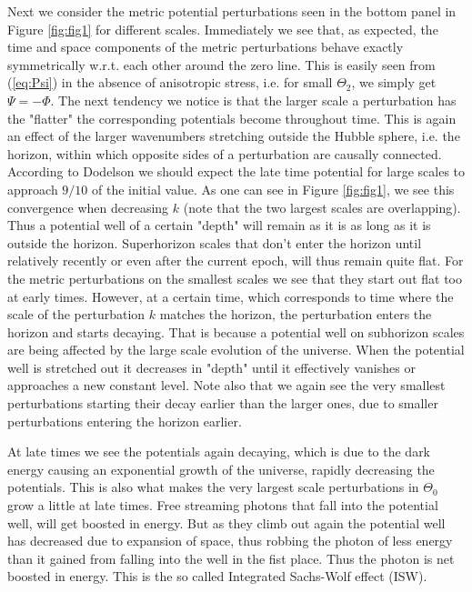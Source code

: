 \documentclass[twocolumn]{aastex62}
\begin{document}
Next we consider the metric potential perturbations seen in the bottom panel in Figure \ref{fig:fig1} for different scales. Immediately we see that, as expected, the time and space components of the metric perturbations behave exactly symmetrically w.r.t. each other around the zero line. This is easily seen from (\ref{eq:Psi}) in the absence of anisotropic stress, i.e. for small $\Theta_2$, we simply get $\Psi = -\Phi$. The next tendency we notice is that the larger scale a perturbation has the "flatter" the corresponding potentials become throughout time. This is again an effect of the larger wavenumbers stretching outside the Hubble sphere, i.e. the horizon, within which opposite sides of a perturbation are causally connected. According to Dodelson \cite[p. 191]{dodelson:2003} we should expect the late time potential for large scales to approach $9/10$ of the initial value. As one can see in Figure \ref{fig:fig1}, we see this convergence when decreasing $k$ (note that the two largest scales are overlapping). Thus a potential well of a certain "depth" will remain as it is as long as it is outside the horizon. Superhorizon scales that don't enter the horizon until relatively recently or even after the current epoch, will thus remain quite flat. For the metric perturbations on the smallest scales we see that they start out flat too at early times. However, at a certain time, which corresponds to time where the scale of the perturbation $k$ matches the horizon, the perturbation enters the horizon and starts decaying. That is because a potential well on subhorizon scales are being affected by the large scale evolution of the universe. When the potential well is stretched out it decreases in "depth" until it effectively vanishes or approaches a new constant level. Note also that we again see the very smallest perturbations starting their decay earlier than the larger ones, due to smaller perturbations entering the horizon earlier. 

At late times we see the potentials again decaying, which is due to the dark energy causing an exponential growth of the universe, rapidly decreasing the potentials. This is also what makes the very largest scale perturbations in $\Theta_0$ grow a little at late times. Free streaming photons that fall into the potential well, will get boosted in energy. But as they climb out again the potential well has decreased due to expansion of space, thus robbing the photon of less energy than it gained from falling into the well in the fist place. Thus the photon is net boosted in energy. This is the so called Integrated Sachs-Wolf effect (ISW).
\end{document}
